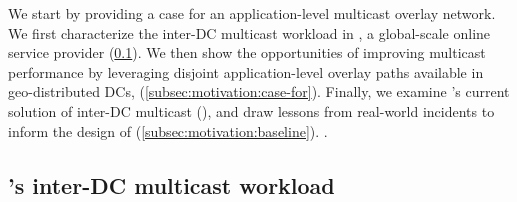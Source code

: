 We start by providing a case for an application-level multicast
overlay network. We first characterize the inter-DC multicast
workload in \company, a global-scale online service provider
(\Section\ref{subsec:motivation:multicast-traffic}). We then show
the opportunities of improving multicast performance by leveraging
disjoint application-level overlay paths available in geo-distributed
DCs,  (\Section\ref{subsec:motivation:case-for}). Finally, we examine \company's current solution of inter-DC multicast (\alg), and draw
lessons from real-world incidents to inform the design of \name
(\Section\ref{subsec:motivation:baseline}). .


\subsection{\company's inter-DC multicast workload}
\label{subsec:motivation:multicast-traffic}


\begin{table}[t!]
\begin{center}
\end{center}
\caption{Inter-DC multicast (replicating data from
one DC to many DCs) dominantes \company's inter-DC
traffic.}
\label{table:rate}
\end{table}


